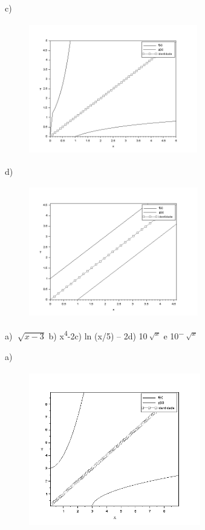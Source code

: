 \begin{respostas}{6}
c)\begin{figure}[H]
    \begin{Center}
        \includegraphics[width=2.9in,height=2.26in]{capitulos/logaritmos_e_funcao_logaritmica/media/image15.png}
    \end{Center}
\end{figure}
d)\begin{figure}[H]
    \begin{Center}
        \includegraphics[width=2.91in,height=2.24in]{capitulos/logaritmos_e_funcao_logaritmica/media/image16.png}
    \end{Center}
\end{figure}

	\ansitem{} a)  \( \sqrt[]{x-3} \) \quad b) x\textsuperscript{4}-2\quad \quad c) ln (x/5) – 2\quad d) 
 10\textsuperscript{\(\sqrt[]{x} \)} e 10\textsuperscript{\(- \sqrt[]{x} \)}  
    \ansitem{} 

a)\begin{figure}[H]
    \begin{Center}
        \includegraphics[width=2.95in,height=2.68in]{capitulos/logaritmos_e_funcao_logaritmica/media/image17.png}
    \end{Center}
\end{figure}


\end{respostas}
